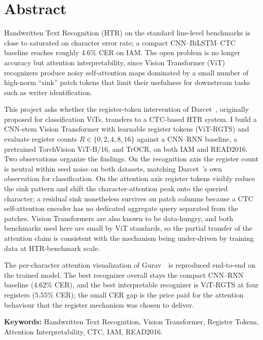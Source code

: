 \section*{Abstract}

Handwritten Text Recognition (HTR) on the standard line-level benchmarks is close to saturated on character error rate; a compact CNN--BiLSTM--CTC baseline reaches roughly $4.6\%$ CER on IAM. The open problem is no longer accuracy but attention interpretability, since Vision Transformer (ViT) recognizers produce noisy self-attention maps dominated by a small number of high-norm ``sink'' patch tokens that limit their usefulness for downstream tasks such as writer identification.

This project asks whether the register-token intervention of Darcet~\etal, originally proposed for classification ViTs, transfers to a CTC-based HTR system. I build a CNN-stem Vision Transformer with learnable register tokens (ViT-RGTS) and evaluate register counts $R \in \{0, 2, 4, 8, 16\}$ against a CNN--RNN baseline, a pretrained TorchVision ViT-B/16, and TrOCR, on both IAM and READ2016. Two observations organize the findings. On the recognition axis the register count is neutral within seed noise on both datasets, matching Darcet~\etal's own observation for classification. On the attention axis register tokens visibly reduce the sink pattern and shift the character-attention peak onto the queried character; a residual sink nonetheless survives on patch columns because a CTC self-attention encoder has no dedicated aggregate query separated from the patches. Vision Transformers are also known to be data-hungry, and both benchmarks used here are small by ViT standards, so the partial transfer of the attention claim is consistent with the mechanism being under-driven by training data at HTR-benchmark scale.

The per-character attention visualization of Gurav~\etal\ is reproduced end-to-end on the trained model. The best recognizer overall stays the compact CNN--RNN baseline ($4.62\%$ CER), and the best interpretable recognizer is ViT-RGTS at four registers ($5.55\%$ CER); the small CER gap is the price paid for the attention behaviour that the register mechanism was chosen to deliver.

\vspace{0.4em}
\noindent\textbf{Keywords:} Handwritten Text Recognition, Vision Transformer, Register Tokens, Attention Interpretability, CTC, IAM, READ2016.
